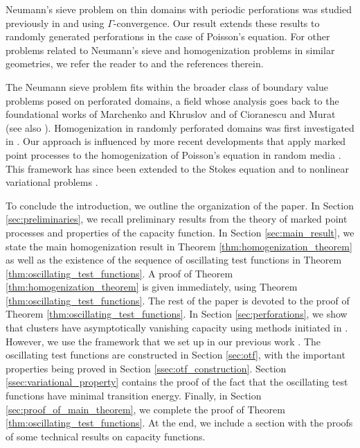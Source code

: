 \documentclass{article}
\numberwithin{equation}{section}
\theoremstyle{definition}
\theoremstyle{remark}
\begin{document}
Neumann's sieve problem on thin domains with periodic perforations was studied previously in \cite{N} and \cite{ABZ} using $\Gamma$-convergence. Our result extends these results to randomly generated perforations in the case of Poisson's equation. For other problems related to Neumann's sieve and homogenization problems in similar geometries, we refer the reader to \cite{AP, CDGO, C1, C2, C, DMFZ, D, DV, M, O, P} and the references therein.

The Neumann sieve problem fits within the broader class of boundary value problems posed on perforated domains, a field whose analysis goes back to the foundational works of Marchenko and Khruslov \cite{MK} and of Cioranescu and Murat \cite{CM1, CM2} (see also \cite{CDG, DMD, DMG}). Homogenization in randomly perforated domains was first investigated in \cite{MK, PV}. Our approach is influenced by more recent developments that apply marked point processes to the homogenization of Poisson’s equation in random media \cite{GHV}. This framework has since been extended to the Stokes equation \cite{GH} and to nonlinear variational problems \cite{SZZ}.

To conclude the introduction, we outline the organization of the paper. In Section \ref{sec:preliminaries}, we recall preliminary results from the theory of marked point processes and properties of the capacity function. In Section \ref{sec:main_result}, we state the main homogenization result in Theorem \ref{thm:homogenization_theorem} as well as the existence of the sequence of oscillating test functions in Theorem \ref{thm:oscillating_test_functions}. A proof of Theorem \ref{thm:homogenization_theorem} is given immediately, using Theorem \ref{thm:oscillating_test_functions}. The rest of the paper is devoted to the proof of Theorem \ref{thm:oscillating_test_functions}. In Section \ref{sec:perforations}, we show that clusters have asymptotically vanishing capacity using methods initiated in \cite{GHV}. However, we use the framework that we set up in our previous work \cite{B}. The oscillating test functions are constructed in Section \ref{sec:otf}, with the important properties being proved in Section \ref{ssec:otf_construction}. Section \ref{ssec:variational_property} contains the proof of the fact that the oscillating test functions have minimal transition energy. Finally, in Section \ref{sec:proof_of_main_theorem}, we complete the proof of Theorem \ref{thm:oscillating_test_functions}. At the end, we include a section with the proofs of some technical results on capacity functions.
\end{document}
